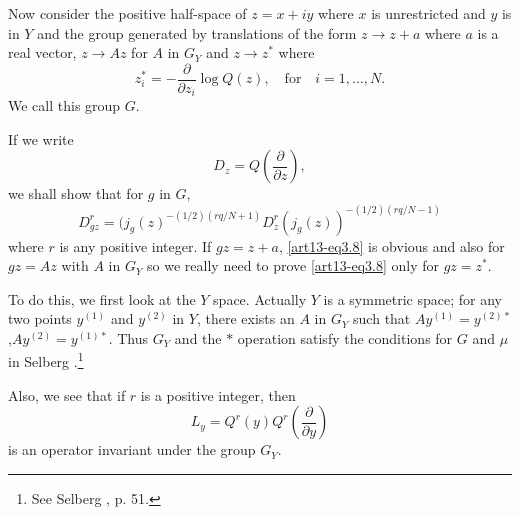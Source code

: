 Now consider the positive half-space of $z=x+iy$ where $x$ is unrestricted and $y$ is in $Y$ and the group generated by translations of the form $z\to z+a$ where $a$ is a real vector, $z\to Az$ for $A$ in $G_{Y}$ and $z\to z^{*}$ where
$$
z_{i}^{*}=-\dfrac{\partial}{\partial z_{i}}\log Q(z),\text{~~ for~~ } i=1,\ldots,N.
$$
We call this group $G$.

If we write
\begin{equation}
D_{z}=Q\left(\frac{\partial}{\partial z}\right),\label{art13-eq3.7}
\end{equation}
we shall show that for $g$ in $G$,
\begin{equation}
D^{r}_{gz}=(j_{g}(z)^{-(1/2)(rq/N+1)}D^{r}_{z}(j_{g}(z))^{-(1/2)(rq/N-1)}\label{art13-eq3.8}
\end{equation}
where $r$ is any positive integer. If $gz=z+a$, \eqref{art13-eq3.8} is obvious and also for $gz=Az$ with $A$ in $G_{Y}$ so we really need to prove \eqref{art13-eq3.8} only for $gz=z^{*}$.

To do this, we first look at the $Y$ space. Actually $Y$ is a symmetric space; for any two points $y^{(1)}$ and $y^{(2)}$ in $Y$, there exists an $A$ in $G_{Y}$ such that $Ay^{(1)}=y^{(2)*}$,\pageoriginale $Ay^{(2)}=y^{(1)*}$. Thus $G_{Y}$ and the $*$ operation satisfy the conditions for $G$ and $\mu$ in Selberg \cite{art13-key3}.\footnote[10]{See Selberg \cite{art13-key10}, p. 51.} 

Also, we see that if $r$ is a positive integer, then
\begin{equation}
L_{y}=Q^{r}(y)Q^{r}\left(\frac{\partial}{\partial y}\right)\label{art13-eq3.9}
\end{equation}
is an operator invariant under the group $G_{Y}$.

